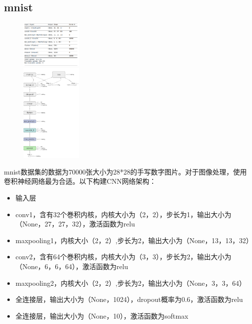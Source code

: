 \documentclass{article}
\begin{document}
\subsection{mnist}
\begin{figure}
\vspace{-15pt}
\includegraphics[width=3cm,clip]{CNN.png}\\
\includegraphics[width=3cm,clip]{CNNnet.png}
\end{figure}
\par
mnist数据集的数据为70000张大小为28*28的手写数字图片。对于图像处理，使用卷积神经网络最为合适。以下构建CNN网络架构：
\begin{itemize}
    \item 输入层
    \item conv1，含有32个巻积内核，内核大小为（2，2），步长为1，输出大小为（None，27，27，32），激活函数为relu
    \item maxpooling1，内核大小（2，2）,步长为2，输出大小为（None，13，13，32）
    \item conv2，含有64个巻积内核，内核大小为（3，3），步长为2，输出大小为（None，6，6，64），激活函数为relu
    \item maxpooling2，内核大小（2，2）,步长为2，输出大小为（None，3，3，64）
    \item 全连接层，输出大小为（None，1024），dropout概率为0.6，激活函数为relu
    \item 全连接层，输出大小为（None，10），激活函数为softmax
\end{itemize}
\end{document}
